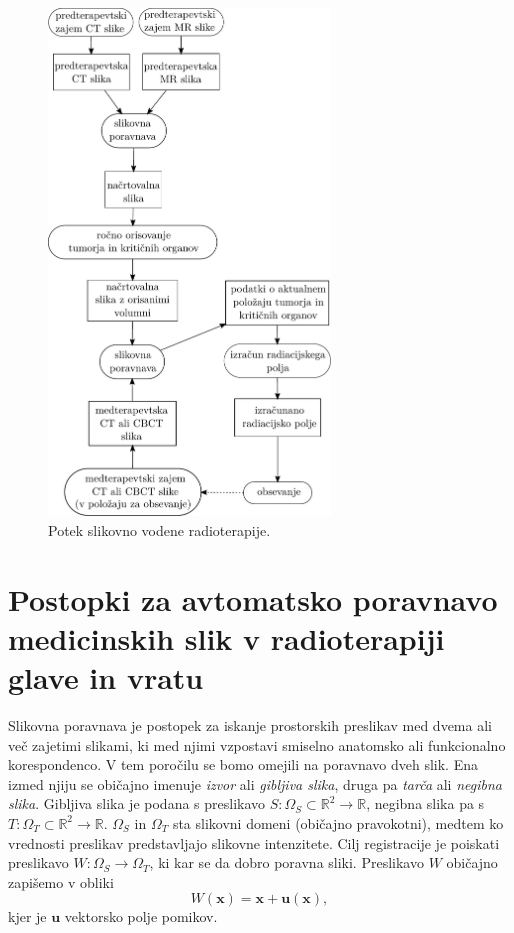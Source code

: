 \documentclass[journal]{IEEEtran}
\begin{document}
\begin{figure} \centering
 \includegraphics[width=7.5cm]{./diagram.pdf}
 \caption{Potek slikovno vodene radioterapije.}
 \label{diagram}
\end{figure}




\section{Postopki za avtomatsko poravnavo medicinskih slik v radioterapiji glave in vratu}


Slikovna poravnava je postopek za iskanje prostorskih preslikav med dvema ali več zajetimi slikami, ki med njimi vzpostavi smiselno anatomsko ali funkcionalno korespondenco. V tem poročilu se bomo omejili na poravnavo dveh slik. Ena izmed njiju se običajno imenuje \emph{izvor} ali \emph{gibljiva slika}, druga pa \emph{tarča} ali \emph{negibna slika}. Gibljiva slika je podana s preslikavo $S\colon\Omega_S\subset\mathbb{R}^2\to\mathbb{R}$, negibna slika pa s $T\colon\Omega_T\subset\mathbb{R}^2\to\mathbb{R}$. $\Omega_S$ in $\Omega_T$ sta slikovni domeni (običajno pravokotni), medtem ko vrednosti preslikav predstavljajo slikovne intenzitete. Cilj registracije je poiskati preslikavo $W\colon\Omega_S\to\Omega_T$, ki kar se da dobro poravna sliki. Preslikavo $W$ običajno zapišemo v obliki
\begin{equation}
 W(\boldsymbol{x}) = \boldsymbol{x} + \boldsymbol{u}(\boldsymbol{x}),
\end{equation}
kjer je $\boldsymbol{u}$ vektorsko polje pomikov.
\end{document}
